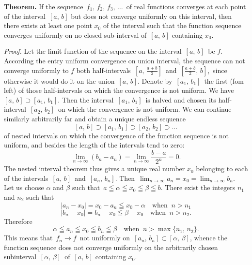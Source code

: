 \documentclass[12pt]{article}
\theoremstyle{definition}
\begin{document}
\textbf{Theorem.}  If the sequence \,$f_1,\,f_2,\,f_3,\,\ldots$\, of real functions converges at each point of the interval \,$[a,\,b]$ but does not converge uniformly on this interval, then there exists at least one point $x_0$ of the interval such that the function sequence converges uniformly on no closed sub-interval of\, $[a,\,b]$ containing $x_0$.

{\em Proof.}  Let the limit function of the sequence on the interval \,$[a,\,b]$\, be $f$.  According the entry uniform convergence on union interval, the sequence can not converge uniformly to $f$ both half-intervals\, $[a,\,\frac{a+b}{2}]$\, and\, $[\frac{a+b}{2},\,b]$,\, since otherwise it would do it on the union \,$[a,\,b]$.  Denote by\, $[a_1,\,b_1]$\, the first (fom left) of those half-intervals on which the convergence is not uniform.  We have\,  $[a,\,b] \supset [a_1,\,b_1]$.  Then the interval\, $[a_1,\,b_1]$\, is halved and chosen its half-interval\, $[a_2,\,b_2]$\, on which the convergence is not uniform.  We can continue similarly arbitrarily far and obtain a unique endless sequence
$$[a,\,b] \supset [a_1,\,b_1] \supset [a_2,\,b_2] \supset \ldots$$
of nested intervals on which the convergence of the function sequence is not uniform, and besides the length of the intervals tend to zero:
$$\lim_{n\to\infty}(b_n-a_n) = \lim_{n\to\infty}\frac{b-a}{2^n} = 0.$$
The nested interval theorem thus gives a unique real number $x_0$ belonging to each of the intervals\, $[a,\,b]$\, and\, $[a_n,\,b_n]$.  Then\, $\lim_{n\to\infty}a_n = x_0 = \lim_{n\to\infty}b_n$.\, Let us choose $\alpha$ and $\beta$ such that\, $a \leqq \alpha \leqq x_0 \leqq \beta \leqq b$.  There exist the integers $n_1$ and $n_2$ such that
$$|a_n-x_0| = x_0-a_n \leqq x_0-\alpha\quad \mbox{when}\;\;n > n_1$$
$$|b_n-x_0| = b_n-x_0 \leqq \beta-x_0\quad \mbox{when}\;\;n > n_2.$$
Therefore\, 
$$\alpha \leqq a_n \leqq x_0 \leqq b_n \leqq \beta \quad\mbox{when}\;\;n > \max\{n_1,\,n_2\}.$$
This means that\, $f_n \to f$\, not uniformly on\, $[a_n,\,b_n] \subset [\alpha,\,\beta]$, whence the function sequence does not converge uniformly on the arbitrarily chosen subinterval\, $[\alpha,\,\beta]$\, of\, $[a,\,b]$ containing $x_0$.

\end{document}

